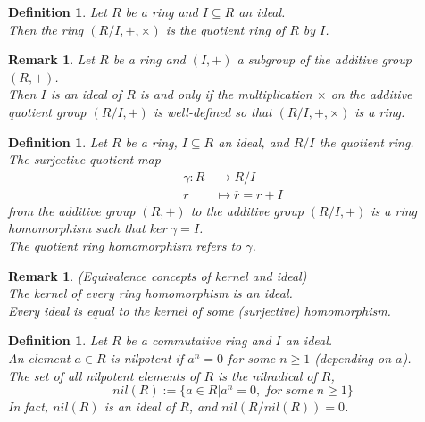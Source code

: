 \documentclass[a4paper,8pt]{article}
\newcommand{\hlt}[1]{\textit{{\color{blue}#1}}}
\theoremstyle{theorem}
\newtheorem{definition}[theorem]{Definition}
\newtheorem{remark}[theorem]{Remark}
\begin{document}
\begin{definition}
Let $R$ be a ring and $I \subseteq R$ an ideal.\\
Then the ring $(R/I, +, \times)$ is the \hlt{quotient ring} of $R$ by $I$.\\
\end{definition}


\begin{remark}
Let $R$ be a ring and $(I, +)$ a subgroup of the additive group $(R, +)$.\\
Then $I$ is an ideal of $R$ is and only if the multiplication $\times$ on the additive quotient group $(R/I, +)$ is well-defined so that $(R/I, +, \times)$ is a ring.\\	
\end{remark}


\begin{definition}
Let $R$ be a ring, $I \subseteq R$ an ideal, and $R/I$ the quotient ring.\\
The \hlt{surjective quotient map} 
\begin{align}
\gamma: R &\rightarrow R/I \nonumber \\
r &\mapsto \overline{r} = r + I \nonumber
\end{align}
from the additive group $(R, +)$ to the additive group $(R/I, +)$ is a ring homomorphism such that $ker \ \gamma = I$.\\
The \hlt{quotient ring homomorphism} refers to $\gamma$.\\
\end{definition}


\begin{remark}
\hlt{(Equivalence concepts of kernel and ideal)}\\
The kernel of every ring homomorphism is an ideal.\\
Every ideal is equal to the kernel of some (surjective) homomorphism.\\
\end{remark}


\begin{definition}
Let $R$ be a commutative ring and $I$ an ideal.\\
An element $a \in R$ is 	\hlt{nilpotent} if $a^n = 0$ for some $n \geq 1$ (depending on $a$).\\
The set of all nilpotent elements of $R$ is the 	\hlt{nilradical of $R$}, 
\begin{equation}
nil(R) := \{a \in R | a^n = 0, \ for \ some \ n \geq 1 \} \nonumber	
\end{equation}
In fact, $nil(R)$ is an ideal of $R$, and $nil(R/nil(R)) = 0$.\\
\end{definition}
\end{document}
